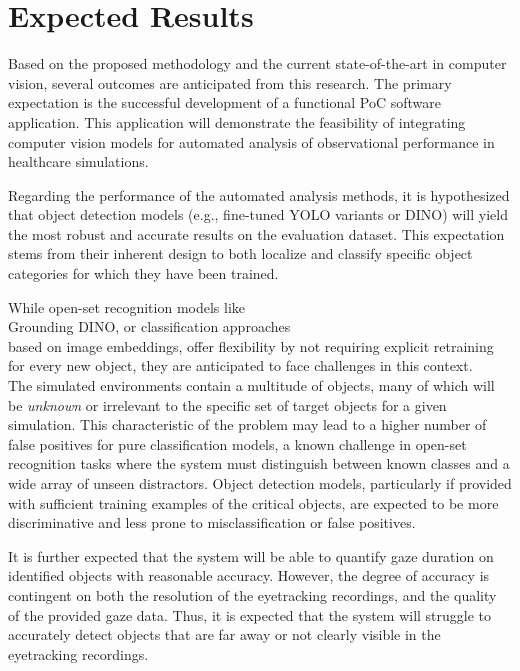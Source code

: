 \documentclass[english]{hogent-article}
\begin{document}
\section{Expected Results}
\label{sec:expected-results}

Based on the proposed methodology and the current state-of-the-art in computer vision, several outcomes are anticipated from this research.
The primary expectation is the successful development of a functional PoC software application. 
This application will demonstrate the feasibility of integrating computer vision models for automated analysis of observational performance in healthcare simulations.

Regarding the performance of the automated analysis methods, it is hypothesized that object detection models (e.g., fine-tuned YOLO variants or DINO) will yield the most robust and accurate results on the evaluation dataset.
This expectation stems from their inherent design to both localize and classify specific object categories for which they have been trained.

While open-set recognition models like\\ Grounding DINO, or classification approaches\\ based on image embeddings, offer flexibility by not requiring explicit retraining for every new object, they are anticipated to face challenges in this context.\\
The simulated environments contain a multitude of objects, many of which will be \textit{unknown} or irrelevant to the specific set of target objects for a given simulation.
This characteristic of the problem may lead to a higher number of false positives for pure classification models, a known challenge in open-set recognition tasks where the system must distinguish between known classes and a wide array of unseen distractors.
Object detection models, particularly if provided with sufficient training examples of the critical objects, are expected to be more discriminative and less prone to misclassification or false positives.

It is further expected that the system will be able to quantify gaze duration on identified objects with reasonable accuracy.
However, the degree of accuracy is contingent on both the resolution of the eyetracking recordings, and the quality of the provided gaze data.
Thus, it is expected that the system will struggle to accurately detect objects that are far away or not clearly visible in the eyetracking recordings. 
\end{document}
